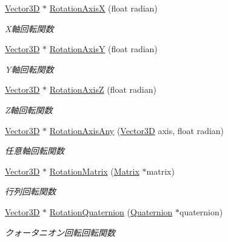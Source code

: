 \begin{DoxyCompactItemize}
\mbox{\hyperlink{class_vector3_d}{Vector3D}} $\ast$ \mbox{\hyperlink{class_vector3_d_a8623201898abbb7816824282f4dac6db}{Rotation\+AxisX}} (float radian)
\begin{DoxyCompactList}\small\item\em X軸回転関数 \end{DoxyCompactList}\item 
\mbox{\hyperlink{class_vector3_d}{Vector3D}} $\ast$ \mbox{\hyperlink{class_vector3_d_a437846b683f4e8fab1ad16d1a96f4944}{Rotation\+AxisY}} (float radian)
\begin{DoxyCompactList}\small\item\em Y軸回転関数 \end{DoxyCompactList}\item 
\mbox{\hyperlink{class_vector3_d}{Vector3D}} $\ast$ \mbox{\hyperlink{class_vector3_d_a34daa7e7dfbf578c45997f2cb06a86ec}{Rotation\+AxisZ}} (float radian)
\begin{DoxyCompactList}\small\item\em Z軸回転関数 \end{DoxyCompactList}\item 
\mbox{\hyperlink{class_vector3_d}{Vector3D}} $\ast$ \mbox{\hyperlink{class_vector3_d_ad20038581979a29c282793023057aef7}{Rotation\+Axis\+Any}} (\mbox{\hyperlink{class_vector3_d}{Vector3D}} axis, float radian)
\begin{DoxyCompactList}\small\item\em 任意軸回転関数 \end{DoxyCompactList}\item 
\mbox{\hyperlink{class_vector3_d}{Vector3D}} $\ast$ \mbox{\hyperlink{class_vector3_d_a8c48b70ba67f7ad84fb04d3b84836e77}{Rotation\+Matrix}} (\mbox{\hyperlink{class_matrix}{Matrix}} $\ast$matrix)
\begin{DoxyCompactList}\small\item\em 行列回転関数 \end{DoxyCompactList}\item 
\mbox{\hyperlink{class_vector3_d}{Vector3D}} $\ast$ \mbox{\hyperlink{class_vector3_d_ab81a157d73d4a3274c8191834b2bfb45}{Rotation\+Quaternion}} (\mbox{\hyperlink{_vector3_d_8h_a3ee38c9c46d9851e33a9a1113328dafc}{Quaternion}} $\ast$quaternion)
\begin{DoxyCompactList}\small\item\em クォータニオン回転回転関数 \end{DoxyCompactList}\end{DoxyCompactItemize}
